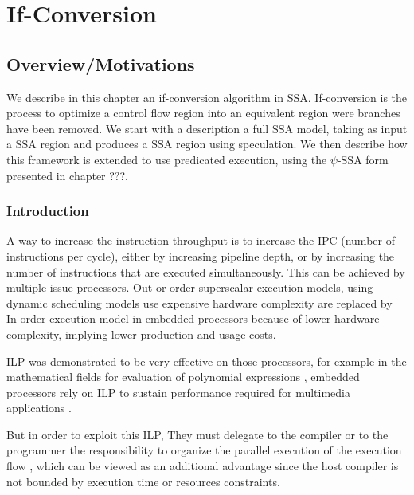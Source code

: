 \chapter{If-Conversion }
\graphicspath{{img/}{if_conversion/img/}{part4/if_conversion/img/}}
	
\newcommand\cond{~?~}


\section{Overview/Motivations}

We describe in this chapter an if-conversion algorithm in SSA. If-conversion is the process to optimize a control flow region into an equivalent region were branches have been removed. We start with a description a full SSA model, taking as input a SSA region and produces a SSA region using speculation. We then describe how this framework is extended to use predicated execution, using the $\psi$-SSA form presented in chapter ???. 

\subsection{Introduction}

A way to increase the instruction throughput is to increase the IPC (number of instructions per cycle), either by increasing pipeline depth, or by increasing the number of instructions that are executed simultaneously. This can be achieved by multiple issue processors. Out-or-order superscalar execution models, using dynamic scheduling models use expensive hardware complexity are replaced by In-order execution model in embedded processors because of lower hardware complexity, implying lower production and usage costs.

ILP was demonstrated to be very effective on those processors, for example in the mathematical fields for evaluation of polynomial expressions \cite{Jeannerod:2010:TTI:1837210.1837212}, embedded processors rely on ILP to sustain performance required for multimedia applications \cite{FisherFaraboshiYoung}.

But in order to exploit this ILP, They must delegate to the compiler or to the programmer the responsibility to organize the parallel execution of the execution flow \cite{Rau:2003:IP:1074100.1074489}, which can be viewed as an additional advantage since the host compiler is not bounded by execution time or resources constraints. 

